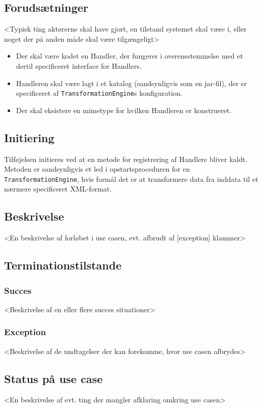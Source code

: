\documentclass{article}
\begin{document}
\subsection{Forudsætninger}
<Typisk ting aktørerne skal have gjort, en tilstand systemet skal være
i, eller noget der på anden måde skal være tilgængeligt>


\begin{itemize}
\item Der skal være kodet en Handler, der fungerer i overensstemmelse
  med et dertil specificeret interface for Handlers.

\item Handleren skal være lagt i et katalog (sandsynligvis som en
  jar-fil), der er specificeret af \texttt{TransformationEngine}s
  konfiguration.

\item Der skal eksistere en mimetype for hvilken Handleren er
  konstrueret.
\end{itemize}


\subsection{Initiering}
Tilføjelsen initieres ved at en metode for registrering af Handlere
bliver kaldt. Metoden er sandsynligvis et led i opstartsproceduren for
en \texttt{TransformationEngine}, hvis formål det er at transformere
data fra inddata til et nærmere specificeret XML-format.


\subsection{Beskrivelse}
<En beskrivelse af forløbet i use casen, evt. afbrudt af [exception] klammer>


\subsection{Terminationstilstande}

\subsubsection{Succes}
<Beskrivelse af en eller flere succes situationer>

\subsubsection{Exception}
<Beskrivelse af de undtagelser der kan forekomme, hvor use casen afbrydes>


\subsection{Status på use case}
<En beskrivelse af evt. ting der mangler afklaring omkring use casen>
\end{document}
